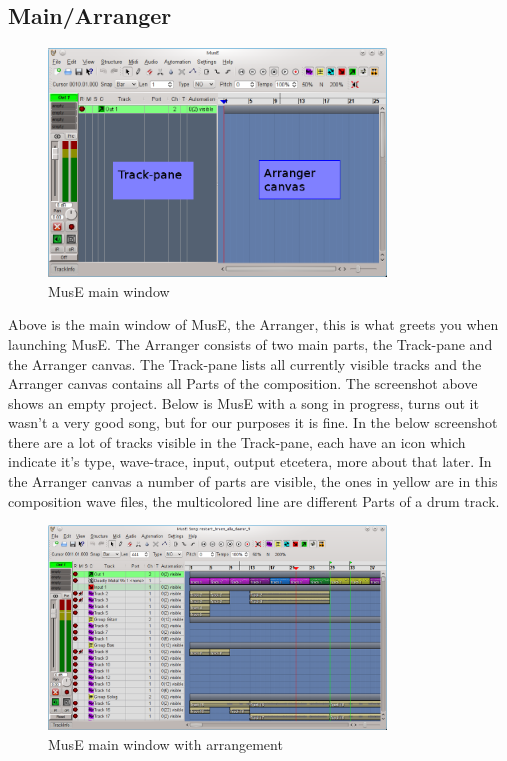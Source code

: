 \documentclass[a4paper]{report}
\newcommand{\screenshotwidth}[0]{0.8\textwidth}
\begin{document}
\subsection{Main/Arranger}

\label{Main/Arranger}
\begin{figure}[htp]
\centering
\includegraphics[width=\screenshotwidth]{pics/main_window_annotated}
\caption{MusE main window}
\label{fig:Main Window}
\end{figure}
Above is the main window of MusE, the Arranger, this is what greets you
when launching MusE. The Arranger consists of two main parts, the Track-pane
and the Arranger canvas. The Track-pane lists all currently visible tracks
and the Arranger canvas contains all Parts of the composition. The
screenshot above shows an empty project. Below is MusE with a song in
progress, turns out it wasn't a very good song, but for our purposes it
is fine. In the below screenshot there are a lot of tracks visible in the
Track-pane, each have an icon which indicate it's type, wave-trace, input,
output etcetera, more about that later. In the Arranger canvas a number of
parts are visible, the ones in yellow are in this composition wave files,
the multicolored line are different Parts of a drum track.
\label{Main/Arranger}
\begin{figure}[htp]
\centering
\includegraphics[width=\screenshotwidth]{pics/main_window_with_arrangement}
\caption{MusE main window with arrangement}
\label{fig:Main Window with arrangement}
\end{figure}
\end{document}
